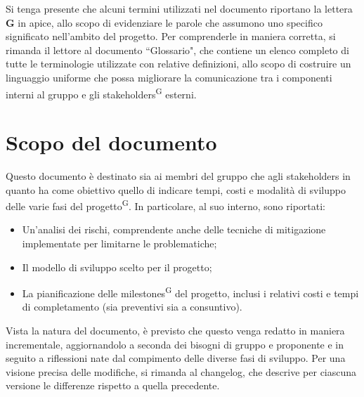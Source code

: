\begin{beginningnote}
    Si tenga presente che alcuni termini utilizzati nel documento riportano la lettera \textbf{G} in apice, allo scopo di evidenziare le parole che assumono uno specifico significato nell'ambito del progetto. Per comprenderle in maniera corretta, si rimanda il lettore al documento ``Glossario", che contiene un elenco completo di tutte le terminologie utilizzate con relative definizioni, allo scopo di costruire un linguaggio uniforme che possa migliorare la comunicazione tra i componenti interni al gruppo e gli stakeholders\textsuperscript{G} esterni.   %
\end{beginningnote}

\section{Scopo del documento}\label{sec:scopo_del_documento}
Questo documento è destinato sia ai membri del gruppo che agli stakeholders in quanto ha come obiettivo quello di indicare tempi, costi e modalità di sviluppo delle varie fasi del progetto\textsuperscript{G}.
In particolare, al suo interno, sono riportati:
\begin{itemize}
    \item Un'analisi dei rischi, comprendente anche delle tecniche di mitigazione implementate per limitarne le problematiche;
    \item Il modello di sviluppo scelto per il progetto;
    \item La pianificazione delle milestones\textsuperscript{G} del progetto, inclusi i relativi costi e tempi di completamento (sia preventivi sia a consuntivo).
\end{itemize}
Vista la natura del documento, è previsto che questo venga redatto in maniera incrementale, aggiornandolo a seconda dei bisogni di gruppo e proponente e in seguito a riflessioni nate dal compimento delle diverse fasi di sviluppo. Per una visione precisa delle modifiche, si rimanda al changelog, che descrive per ciascuna versione le differenze rispetto a quella precedente.

